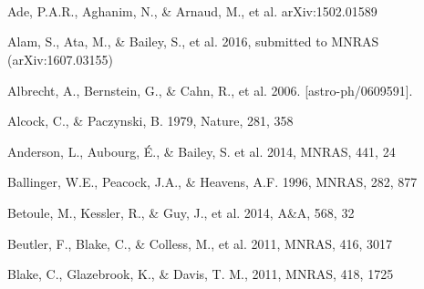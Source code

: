 \documentclass[iop]{emulateapj}
\begin{document}
\

\

\

\begin{thebibliography}{}

Ade, P.A.R., Aghanim, N., \& Arnaud, M., et al. arXiv:1502.01589

Alam, S., Ata, M., \& Bailey, S., et al. 2016,
submitted to MNRAS (arXiv:1607.03155)

Albrecht, A., Bernstein, G., \& Cahn, R., et al. 2006. [astro-ph/0609591].



Alcock, C., \& Paczynski, B. 1979, Nature, 281, 358  


Anderson, L., Aubourg, \'E., \& Bailey, S. et al. 2014, MNRAS, 441, 24  
  

Ballinger, W.E., Peacock, J.A., \& Heavens, A.F. 1996, MNRAS, 282, 877  

Betoule, M., Kessler, R., \& Guy, J., et al. 2014, A\&A, 568, 32


Beutler, F., Blake, C., \& Colless, M., et al. 2011, MNRAS, 416, 3017



Blake, C., Glazebrook, K., \& Davis, T. M., 2011, MNRAS, 418, 1725  



\end{thebibliography}
\end{document}
